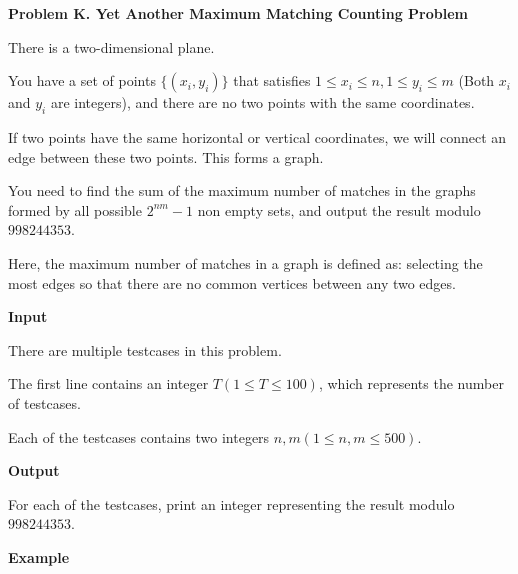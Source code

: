 \documentclass[a4paper]{article}
\begin{document}
\newpage


\textbf{\Large\textsf{Problem K. Yet Another Maximum Matching Counting Problem}}
\vspace{0.01\textheight}

There is a two-dimensional plane.
    
    
    
You have a set of points $\{(x_i,y_i)\}$ that satisfies $1\le x_i\le n, 1\le y_i\le m$ (Both $x_i$ and $y_i$ are integers), and there are no two points with the same coordinates.
    
    
    
If two points have the same horizontal or vertical coordinates, we will connect an edge between these two points. This forms a graph.
    
    
    
You need to find the sum of the maximum number of matches in the graphs formed by all possible $2^{nm}-1$ non empty sets, and output the result modulo $998244353$.
    
    
    
Here, the maximum number of matches in a graph is defined as: selecting the most edges so that there are no common vertices between any two edges.

\vspace{0.01\textheight}
\textbf{\textsf{Input}}
\vspace{0.01\textheight}

There are multiple testcases in this problem.
    
    
    
The first line contains an integer $T(1\le T\le 100)$, which represents the number of testcases.
    
    
    
Each of the testcases contains two integers $n,m(1\leq n,m\leq 500)$.

\vspace{0.01\textheight}
\textbf{\textsf{Output}}
\vspace{0.01\textheight}

For each of the testcases, print an integer representing the result modulo $998244353$.

\vspace{0.01\textheight}
\textbf{\textsf{Example}}
\vspace{0.01\textheight}
\end{document}
